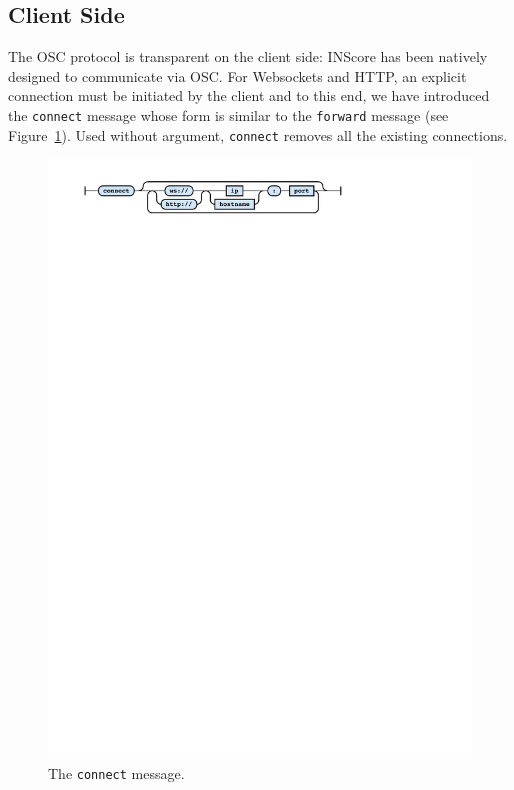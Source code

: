 \documentclass{article}
\newcommand{\icode}[1]	{{\small \texttt{#1}}}
\begin{document}
\subsection{Client Side}\label{sec:client}
The OSC protocol is transparent on the client side: INScore has been natively designed to communicate via OSC.
For Websockets and HTTP, an explicit connection must be initiated by the client and to this end, we have introduced the \icode{connect} message whose form is similar to the \icode{forward} message (see Figure~\ref{fig:connect}). Used without argument, \icode{connect} removes all the existing connections.
\begin{figure}[h]
\centering
\includegraphics[width=0.98\columnwidth]{rsrc/faust5.pdf}
\caption{The \icode{connect} message.}
\label{fig:connect}
\end{figure}\\
\end{document}
